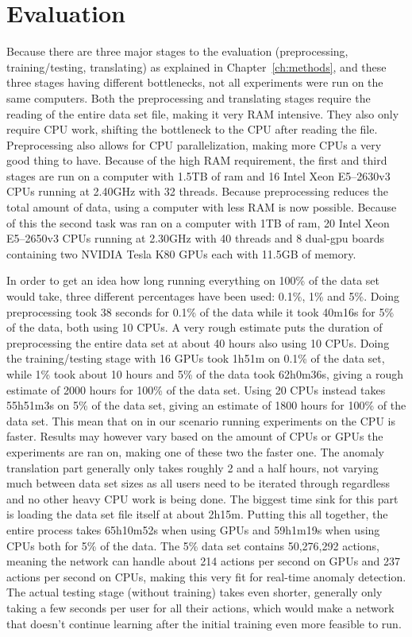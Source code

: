 \chapter{Evaluation}\label{ch:evaluation}

Because there are three major stages to the evaluation (preprocessing, training/testing, translating) as explained in Chapter~\ref{ch:methods}, and these three stages having different bottlenecks, not all experiments were run on the same computers. Both the preprocessing and translating stages require the reading of the entire data set file, making it very RAM intensive. They also only require CPU work, shifting the bottleneck to the CPU after reading the file. Preprocessing also allows for CPU parallelization, making more CPUs a very good thing to have. Because of the high RAM requirement, the first and third stages are run on a computer with 1.5TB of ram and 16 Intel Xeon E5--2630v3 CPUs running at 2.40GHz with 32 threads. Because preprocessing reduces the total amount of data, using a computer with less RAM is now possible.  Because of this the second task was ran on a computer with 1TB of ram, 20 Intel Xeon E5--2650v3 CPUs running at 2.30GHz with 40 threads and 8 dual-gpu boards containing two NVIDIA Tesla K80 GPUs each with 11.5GB of memory. 

In order to get an idea how long running everything on 100\% of the data set would take, three different percentages have been used: 0.1\%, 1\% and 5\%. Doing preprocessing took 38 seconds for 0.1\% of the data while it took 40m16s for 5\% of the data, both using 10 CPUs. A very rough estimate puts the duration of preprocessing the entire data set at about 40 hours also using 10 CPUs. Doing the training/testing stage with 16 GPUs took 1h51m on 0.1\% of the data set, while 1\% took about 10 hours and 5\% of the data took 62h0m36s, giving a rough estimate of 2000 hours for 100\% of the data set. Using 20 CPUs instead takes 55h51m3s on 5\% of the data set, giving an estimate of 1800 hours for 100\% of the data set. This mean that on in our scenario running experiments on the CPU is faster. Results may however vary based on the amount of CPUs or GPUs the experiments are ran on, making one of these two the faster one. The anomaly translation part generally only takes roughly 2 and a half hours, not varying much between data set sizes as all users need to be iterated through regardless and no other heavy CPU work is being done. The biggest time sink for this part is loading the data set file itself at about 2h15m. Putting this all together, the entire process takes 65h10m52s when using GPUs and 59h1m19s when using CPUs both for 5\% of the data. The 5\% data set contains 50,276,292 actions, meaning the network can handle about 214 actions per second on GPUs and 237 actions per second on CPUs, making this very fit for real-time anomaly detection. The actual testing stage (without training) takes even shorter, generally only taking a few seconds per user for all their actions, which would make a network that doesn't continue learning after the initial training even more feasible to run.